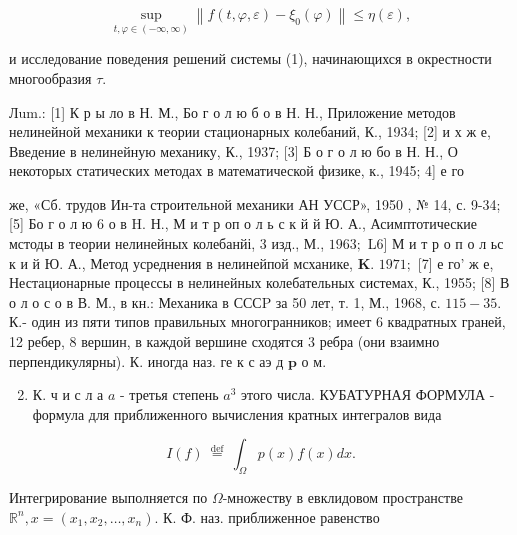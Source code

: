 \documentclass[10pt]{article}
\begin{document}
\[

\sup _{t, \varphi \in(-\infty, \infty)}\left\|f(t, \varphi, \varepsilon)-\xi_{0}(\varphi)\right\| \leqslant \eta(\varepsilon),

\]



и исследование поведения решений системы (1), начинающихся в окрестности многообразия $\tau$.



Лum.: [1] К р ы ло в Н. М., Бо г о л ю б о в Н. Н., Приложение методов нелинейной механики $к$ теории стационарных колебаний, К., 1934; [2] и х ж е, Введение в нелинейную механику, К., 1937; [3] Б о г о л ю бо в Н. Н., О некоторых статических методах в математической физике, к., 1945; 4] е го

же, «Сб. трудов Ин-та строительной механики АН УССР», 1950 , № 14, с. 9-34; [5] Бо г о л ю 6 о в H. Н., М и т р оп о л ь с к й й Ю. А., Асимптотические мстоды в теории нелинейных колебанйі, 3 изд., М., $1963 ;$ L6] М и т р о п о л ьс к и й Ю. А., Метод усреднения в нелинейпой мсханике, $\mathbf{K}$. $1971 ;$ [7] е го' ж е, Нестационарные процессы в нелинейных колебательных системах, К., 1955; [8] В о л о с о в В. М., в кн.: Механика в СССP за 50 лет, т. 1, М., 1968, с. $115-35$. К.- один из пяти типов правильных многогранников; имеет 6 квадратных граней, 12 ребер, 8 вершин, в каждой вершине сходятся 3 ребра (они взаимно перпендикулярны). К. иногда наз. ге к с аэ д $\mathbf{p}$ о м.



\begin{enumerate}

  \setcounter{enumi}{1}

  \item К. ч и с л а $a$ - третья степень $a^{3}$ этого числа. КУБАТУРНАЯ ФОРМУЛА - формула для приближенного вычисления кратных интегралов вида

\end{enumerate}



\[

I(f) \stackrel{\text { def }}{=} \int_{\Omega} p(x) f(x) d x .

\]



Интегрирование выполняется по $\Omega$-множеству в евклидовом пространстве $\mathbb{R}^{n}, x=\left(x_{1}, x_{2}, \ldots, x_{n}\right)$. К. Ф. наз. приближенное равенство
\end{document}
